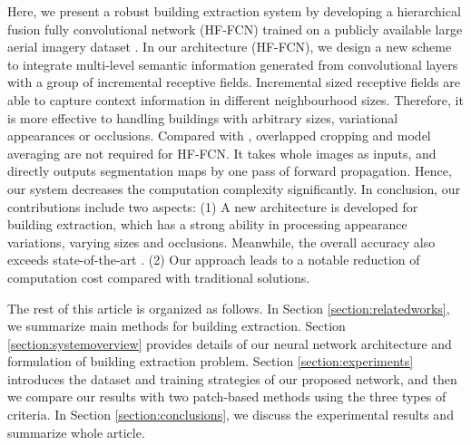 \documentclass[runningheads]{llncs}
\begin{document}
  Here, we present a robust building extraction system by developing a hierarchical fusion fully convolutional network (HF-FCN) trained on a publicly available large aerial imagery dataset \cite{Mnih2013Machine}. In our architecture (HF-FCN), we design a new scheme to integrate multi-level semantic information generated from convolutional layers with a group of incremental receptive fields. Incremental sized receptive fields are able to capture context information in different neighbourhood sizes. Therefore, it is more effective to handling buildings with arbitrary sizes, variational appearances or occlusions. Compared with \cite{Mnih2013Machine,Saito2016Multiple}, overlapped cropping and model averaging are not required for HF-FCN. It takes whole images as inputs, and directly outputs segmentation maps by one pass of forward propagation. Hence, our system decreases the computation complexity significantly. In conclusion, our contributions include two aspects: (1) A new architecture is developed for building extraction, which has a strong ability in processing appearance variations,  varying sizes and occlusions. Meanwhile, the overall accuracy  also exceeds state-of-the-art \cite{Saito2016Multiple}. (2) Our approach leads to a notable reduction of computation cost  compared with traditional solutions.
  
  
   The rest of this article is organized as follows. In Section \ref{section:relatedworks}, we summarize main   methods for building extraction. Section \ref{section:systemoverview} provides details of our neural network architecture and formulation of building extraction problem. Section \ref{section:experiments} introduces the dataset and training strategies of our proposed network, and then we compare our results with two patch-based methods using the three types of criteria. In Section \ref{section:conclusions}, we discuss the experimental results and summarize whole article. 
   
   
\end{document}
